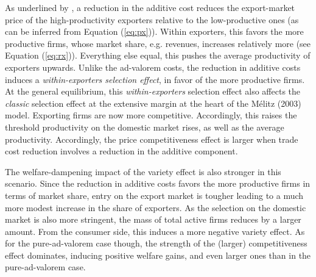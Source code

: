 \documentclass[a4paper,11pt]{article}
\begin{document}
As underlined by \cite{sorensen2014}, a reduction in the additive cost reduces the export-market price of the high-productivity exporters relative to the low-productive ones (as can be inferred from Equation (\ref{eq:px})).
Within exporters, this favors the more productive firms, whose market share, e.g. revenues, increases relatively more (see Equation (\ref{eq:rx})).
Everything else equal, this pushes the average productivity of exporters upwards.
Unlike the ad-valorem costs, the reduction in additive costs induces a \textit{within-exporters selection effect}, in favor of the more productive firms.
At the general equilibrium, this \textit{within-exporters} selection effect also affects the \textit{classic} selection effect at the extensive margin at the heart of the M\'{e}litz (2003) model.
Exporting firms are now more competitive. Accordingly, this raises the threshold productivity on the domestic market rises, as well as the average productivity.
Accordingly, the price competitiveness effect is larger when trade cost reduction involves a reduction in the additive component.

The welfare-dampening impact of the variety effect is also stronger in this scenario.
Since the reduction in additive costs favors the more productive firms in terms of market share, entry on the export market is tougher leading to a much more modest increase in the share of exporters.
As the selection on the domestic market is also more stringent, the mass of total active firms reduces by a larger amount.
From the consumer side, this induces a more negative variety effect.
As for the pure-ad-valorem case though, the strength of the (larger) competitiveness effect dominates, inducing positive welfare gains, and even larger ones than in the pure-ad-valorem case.\medskip
\end{document}
